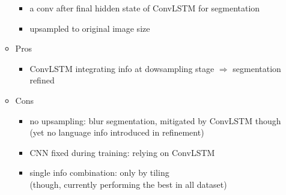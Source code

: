 \begin{itemize}
\begin{itemize}
		\begin{itemize}
		\item a conv after final hidden state of ConvLSTM for segmentation
		\item upsampled to original image size
		\end{itemize}
	\item Pros
		\begin{itemize}
		\item ConvLSTM integrating info at dowsampling stage $\Rightarrow$ segmentation refined
		\end{itemize}
	\item Cons
		\begin{itemize}
		\item no upsampling: blur segmentation, mitigated by ConvLSTM though \\
		(yet no language info introduced in refinement)
		\item CNN fixed during training: relying on ConvLSTM
		\item single info combination: only by tiling \\
		(though, currently performing the best in all dataset)
		\end{itemize}
	\end{itemize}
\end{itemize}


